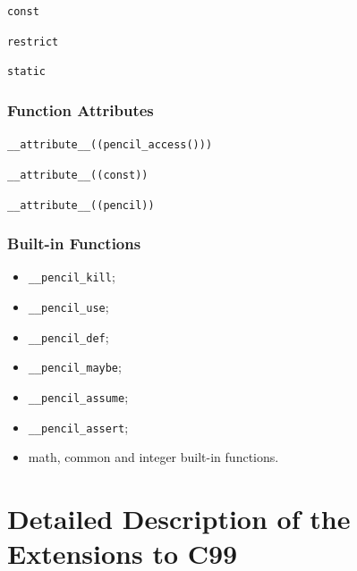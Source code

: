 \begin{description}
  \item \lstinline!const!
  \item \lstinline!restrict!
  \item \lstinline!static!
\end{description}

%

\subsubsection*{Function Attributes}

\begin{description}
  \item \lstinline!__attribute__((pencil_access()))!
  \item \lstinline!__attribute__((const))!
  \item \lstinline!__attribute__((pencil))!
\end{description}

\subsubsection*{Built-in Functions}

\begin{itemize}
\item \lstinline!__pencil_kill!;
\item \lstinline!__pencil_use!;
\item \lstinline!__pencil_def!;
\item \lstinline!__pencil_maybe!;
\item \lstinline!__pencil_assume!;
\item \lstinline!__pencil_assert!;
\item \pencil math, common and integer built-in functions.
\end{itemize}

\section{Detailed Description of the Extensions to C99}
\label{sec:Annotations-and-directives}

